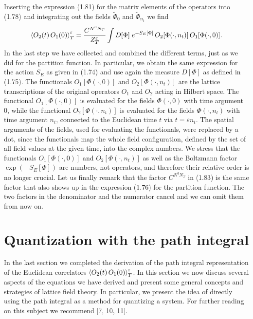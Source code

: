 Inserting the expression (1.81) for the matrix elements of the operators into
(1.78) and integrating out the fields $\tilde{\Phi}_0$ and $\tilde{\Phi}_{n_t}$
we find
\begin{equation}
  \left\langle O_2(t)\,O_1(0) \right\rangle_T^\varepsilon
  = \frac{C^{N^3N_T}}{Z_T^\varepsilon}\int D[\Phi]\;e^{-S_E[\Phi]}\,
    O_2[\Phi(\cdot,n_t)]\,O_1[\Phi(\cdot,0)].
\end{equation}
In the last step we have collected and combined the different terms, just as we
did for the partition function. In particular, we obtain the same expression
for the action $S_E$ as given in (1.74) and use again the measure $D[\Phi]$ as
defined in (1.75). The functionals $O_1[\Phi(\cdot,0)]$ and $O_2[\Phi(\cdot,n_t)]$
are the lattice transcriptions of the original operators $O_1$ and $O_2$ acting
in Hilbert space. The functional $O_1[\Phi(\cdot,0)]$ is evaluated for the
fields $\Phi(\cdot,0)$ with time argument 0, while the functional
$O_2[\Phi(\cdot,n_t)]$ is evaluated for the fields $\Phi(\cdot,n_t)$ with time
argument $n_t$, connected to the Euclidean time $t$ via $t = \varepsilon n_t$.
The spatial arguments of the fields, used for evaluating the functionals, were
replaced by a dot, since the functionals map the whole field configuration,
defined by the set of all field values at the given time, into the complex
numbers. We stress that the functionals $O_1[\Phi(\cdot,0)]$ and
$O_2[\Phi(\cdot,n_t)]$ as well as the Boltzmann factor $\exp(-S_E[\Phi])$ are
numbers, not operators, and therefore their relative order is no longer
crucial. Let us finally remark that the factor $C^{N^3N_T}$ in (1.83) is the
same factor that also shows up in the expression (1.76) for the partition
function. The two factors in the denominator and the numerator cancel and we
can omit them from now on.

\section{Quantization with the path integral}

In the last section we completed the derivation of the path integral
representation of the Euclidean correlators $\left\langle O_2(t)\,O_1(0) \right\rangle_T^\varepsilon$.
In this section we now discuss several aspects of the equations we have derived
and present some general concepts and strategies of lattice field theory. In
particular, we present the idea of directly using the path integral as a method
for quantizing a system. For further reading on this subject we recommend
[7, 10, 11].

